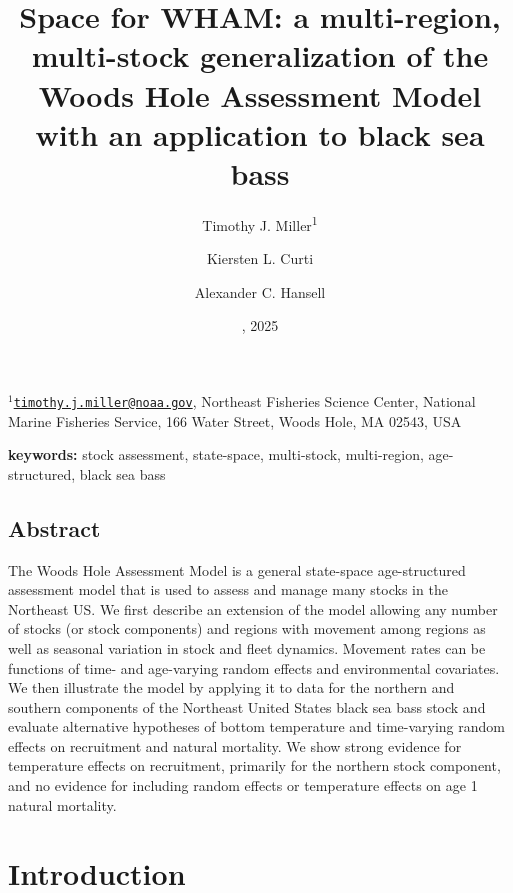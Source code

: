 \documentclass[
]{article}
\title{Space for WHAM: a multi-region, multi-stock generalization of the Woods Hole Assessment Model with an application to black sea bass}
\author{Timothy J. Miller\textsuperscript{1} \and Kiersten L. Curti \and Alexander C. Hansell}
\date{\DIFdelbegin \DIFdel{19 March}\DIFdelend \DIFaddbegin \DIFadd{16 May}\DIFaddend , 2025}
\begin{document}
\maketitle

\(^1\)\href{mailto:timothy.j.miller@noaa.gov}{\nolinkurl{timothy.j.miller@noaa.gov}}, Northeast Fisheries Science Center, National Marine Fisheries Service, 166 Water Street, Woods Hole, MA 02543, USA\\

\pagebreak

\textbf{keywords:} stock assessment, state-space, multi-stock, multi-region, age-structured, black sea bass

\hypertarget{abstract}{%
\subsection*{Abstract}\label{abstract}}

The Woods Hole Assessment Model is a general state-space age-structured assessment model that is used to assess and manage many stocks in the Northeast US. We first describe an extension of the model allowing any number of stocks (or stock components) and regions with movement among regions as well as seasonal variation in stock and fleet dynamics. Movement rates can be functions of time- and age-varying random effects and environmental covariates. We then illustrate the model by applying it to data for the northern and southern components of the Northeast United States black sea bass stock and evaluate alternative hypotheses of bottom temperature and time-varying random effects on recruitment and natural mortality. We show strong evidence for temperature effects on recruitment, primarily for the northern stock component, and no evidence for including random effects or temperature effects on age 1 natural mortality.

\pagebreak

\hypertarget{introduction}{%
\section*{Introduction}\label{introduction}}
\end{document}
